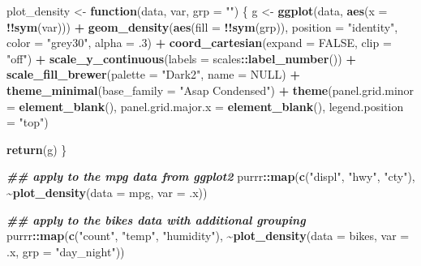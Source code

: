\documentclass[
]{krantz}
\makeatletter
\newenvironment{Shaded}{\begin{snugshade}}{\end{snugshade}}
\newcommand{\AttributeTok}[1]{\textcolor[rgb]{0.27,0.27,0.27}{#1}}
\newcommand{\ConstantTok}[1]{\textcolor[rgb]{0.37,0.37,0.37}{#1}}
\newcommand{\ControlFlowTok}[1]{\textcolor[rgb]{0.27,0.27,0.27}{\textbf{#1}}}
\newcommand{\DecValTok}[1]{\textcolor[rgb]{0.06,0.06,0.06}{#1}}
\newcommand{\DocumentationTok}[1]{\textcolor[rgb]{0.37,0.37,0.37}{\textbf{\textit{#1}}}}
\newcommand{\FunctionTok}[1]{\textcolor[rgb]{0.27,0.27,0.27}{\textbf{#1}}}
\newcommand{\NormalTok}[1]{#1}
\newcommand{\OtherTok}[1]{\textcolor[rgb]{0.37,0.37,0.37}{#1}}
\newcommand{\SpecialCharTok}[1]{\textcolor[rgb]{0.43,0.43,0.43}{\textbf{#1}}}
\newcommand{\StringTok}[1]{\textcolor[rgb]{0.5,0.5,0.5}{#1}}
\newenvironment{kframe}{%
\medskip{}
\setlength{\fboxsep}{.8em}
 \def\at@end@of@kframe{}%
 \ifinner\ifhmode%
  \def\at@end@of@kframe{\end{minipage}}%
  \begin{minipage}{\columnwidth}%
 \fi\fi%
 \def\FrameCommand##1{\hskip\@totalleftmargin \hskip-\fboxsep
 \colorbox{shadecolor}{##1}\hskip-\fboxsep
     \hskip-\linewidth \hskip-\@totalleftmargin \hskip\columnwidth}%
 \MakeFramed {\advance\hsize-\width
   \@totalleftmargin\z@ \linewidth\hsize
   \@setminipage}}%
 {\par\unskip\endMakeFramed%
 \at@end@of@kframe}
\renewenvironment{Shaded}{\begin{kframe}}{\end{kframe}}
\makeatother
\begin{document}
\begin{Shaded}
\begin{Highlighting}[]
\NormalTok{plot\_density }\OtherTok{\textless{}{-}} \ControlFlowTok{function}\NormalTok{(data, var, }\AttributeTok{grp =} \StringTok{""}\NormalTok{) \{}
\NormalTok{  g }\OtherTok{\textless{}{-}} 
    \FunctionTok{ggplot}\NormalTok{(data, }\FunctionTok{aes}\NormalTok{(}\AttributeTok{x =} \SpecialCharTok{!!}\FunctionTok{sym}\NormalTok{(var))) }\SpecialCharTok{+}
    \FunctionTok{geom\_density}\NormalTok{(}\FunctionTok{aes}\NormalTok{(}\AttributeTok{fill =} \SpecialCharTok{!!}\FunctionTok{sym}\NormalTok{(grp)), }\AttributeTok{position =} \StringTok{"identity"}\NormalTok{,}
                 \AttributeTok{color =} \StringTok{"grey30"}\NormalTok{, }\AttributeTok{alpha =}\NormalTok{ .}\DecValTok{3}\NormalTok{) }\SpecialCharTok{+}
    \FunctionTok{coord\_cartesian}\NormalTok{(}\AttributeTok{expand =} \ConstantTok{FALSE}\NormalTok{, }\AttributeTok{clip =} \StringTok{"off"}\NormalTok{) }\SpecialCharTok{+}
    \FunctionTok{scale\_y\_continuous}\NormalTok{(}\AttributeTok{labels =}\NormalTok{ scales}\SpecialCharTok{::}\FunctionTok{label\_number}\NormalTok{()) }\SpecialCharTok{+}
    \FunctionTok{scale\_fill\_brewer}\NormalTok{(}\AttributeTok{palette =} \StringTok{"Dark2"}\NormalTok{, }\AttributeTok{name =} \ConstantTok{NULL}\NormalTok{) }\SpecialCharTok{+}
    \FunctionTok{theme\_minimal}\NormalTok{(}\AttributeTok{base\_family =} \StringTok{"Asap Condensed"}\NormalTok{) }\SpecialCharTok{+}
    \FunctionTok{theme}\NormalTok{(}\AttributeTok{panel.grid.minor =} \FunctionTok{element\_blank}\NormalTok{(),}
          \AttributeTok{panel.grid.major.x =} \FunctionTok{element\_blank}\NormalTok{(),}
          \AttributeTok{legend.position =} \StringTok{"top"}\NormalTok{)}
    
  \FunctionTok{return}\NormalTok{(g)}
\NormalTok{\}}

\DocumentationTok{\#\# apply to the \textasciigrave{}mpg\textasciigrave{} data from ggplot2}
\NormalTok{purrr}\SpecialCharTok{::}\FunctionTok{map}\NormalTok{(}\FunctionTok{c}\NormalTok{(}\StringTok{"displ"}\NormalTok{, }\StringTok{"hwy"}\NormalTok{, }\StringTok{"cty"}\NormalTok{), }
           \SpecialCharTok{\textasciitilde{}}\FunctionTok{plot\_density}\NormalTok{(}\AttributeTok{data =}\NormalTok{ mpg, }\AttributeTok{var =}\NormalTok{ .x))}

\DocumentationTok{\#\# apply to the \textasciigrave{}bikes\textasciigrave{} data with additional grouping}
\NormalTok{purrr}\SpecialCharTok{::}\FunctionTok{map}\NormalTok{(}\FunctionTok{c}\NormalTok{(}\StringTok{"count"}\NormalTok{, }\StringTok{"temp"}\NormalTok{, }\StringTok{"humidity"}\NormalTok{), }
           \SpecialCharTok{\textasciitilde{}}\FunctionTok{plot\_density}\NormalTok{(}\AttributeTok{data =}\NormalTok{ bikes, }\AttributeTok{var =}\NormalTok{ .x, }\AttributeTok{grp =} \StringTok{"day\_night"}\NormalTok{))}
\end{Highlighting}
\end{Shaded}
\end{document}
